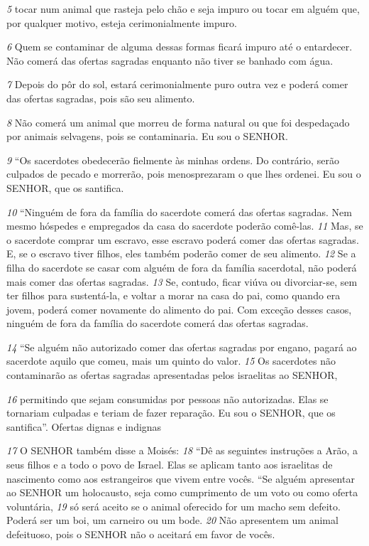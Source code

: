 \textit{\tiny 5} tocar num animal que rasteja pelo chão e seja impuro ou tocar em
alguém que, por qualquer motivo, esteja cerimonialmente impuro.
 
\textit{\tiny 6} Quem se
contaminar de alguma dessas formas ficará impuro até o entardecer. Não comerá
das ofertas sagradas enquanto não tiver se banhado com água.
 
\textit{\tiny 7} Depois do pôr do
sol, estará cerimonialmente puro outra vez e poderá comer das ofertas sagradas,
pois são seu alimento.
 
\textit{\tiny 8} Não comerá um animal que morreu de forma natural ou
que foi despedaçado por animais selvagens, pois se contaminaria. Eu sou o
SENHOR.
  
\textit{\tiny 9} “Os   sacerdotes obedecerão fielmente às minhas ordens. Do contrário, serão
culpados de pecado e morrerão, pois menosprezaram o que lhes ordenei. Eu sou o
SENHOR, que os santifica.
   
\textit{\tiny 10}
“Ninguém de fora da família do sacerdote comerá das ofertas sagradas. Nem
mesmo hóspedes e empregados da casa do sacerdote poderão comê-las. 
\textit{\tiny 11}
Mas, se
o sacerdote comprar um escravo, esse escravo poderá comer das ofertas sagradas.
E, se o escravo tiver filhos, eles também poderão comer de seu alimento. 
\textit{\tiny 12}
Se a
filha do sacerdote se casar com alguém de fora da família sacerdotal, não poderá
mais comer das ofertas sagradas. 
\textit{\tiny 13}
Se, contudo, ficar viúva ou divorciar-se, sem
ter filhos para sustentá-la, e voltar a morar na casa do pai, como quando era
jovem, poderá comer novamente do alimento do pai. Com exceção desses casos,
ninguém de fora da família do sacerdote comerá das ofertas sagradas.
   
\textit{\tiny 14}
“Se alguém não autorizado comer das ofertas sagradas por engano, pagará ao
sacerdote aquilo que comeu, mais um quinto do valor. 
\textit{\tiny 15}
Os sacerdotes não
contaminarão as ofertas sagradas apresentadas pelos israelitas ao SENHOR,

\textit{\tiny 16}
permitindo que sejam consumidas por pessoas não autorizadas. Elas se
tornariam culpadas e teriam de fazer reparação. Eu sou o SENHOR, que os
santifica”.
Ofertas dignas e indignas

\textit{\tiny 17}
O SENHOR também disse a Moisés: 
\textit{\tiny 18}
“Dê as seguintes instruções a Arão, a seus
filhos e a todo o povo de Israel. Elas se aplicam tanto aos israelitas de nascimento
como aos estrangeiros que vivem entre vocês.
   “Se alguém apresentar ao SENHOR um holocausto, seja como cumprimento de
um voto ou como oferta voluntária, 
\textit{\tiny 19}
só será aceito se o animal oferecido for um
macho sem defeito. Poderá ser um boi, um carneiro ou um bode. 
\textit{\tiny 20}
Não
apresentem um animal defeituoso, pois o SENHOR não o aceitará em favor de
vocês.
   
